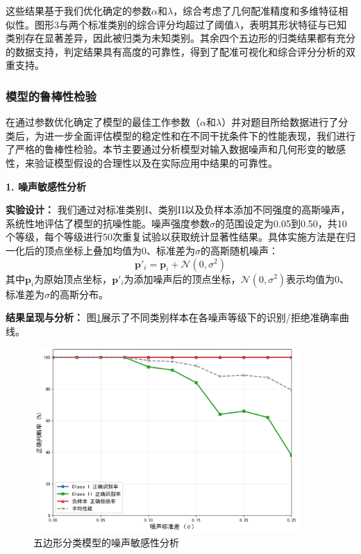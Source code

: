 这些结果基于我们优化确定的参数$\alpha$和$\lambda$，综合考虑了几何配准精度和多维特征相似性。图形3与两个标准类别的综合评分均超过了阈值$\lambda$，表明其形状特征与已知类别存在显著差异，因此被归类为未知类别。其余四个五边形的归类结果都有充分的数据支持，判定结果具有高度的可靠性，得到了配准可视化和综合评分分析的双重支持。

\subsubsection{模型的鲁棒性检验}
在通过参数优化确定了模型的最佳工作参数（$\alpha$和$\lambda$）并对题目所给数据进行了分类后，为进一步全面评估模型的稳定性和在不同干扰条件下的性能表现，我们进行了严格的鲁棒性检验。本节主要通过分析模型对输入数据噪声和几何形变的敏感性，来验证模型假设的合理性以及在实际应用中结果的可靠性。

\textbf{1. 噪声敏感性分析}

\textbf{实验设计：} 我们通过对标准类别I、类别II以及负样本添加不同强度的高斯噪声，系统性地评估了模型的抗噪性能。噪声强度参数$\sigma$的范围设定为0.05到0.50，共10个等级，每个等级进行50次重复试验以获取统计显著性结果。具体实施方法是在归一化后的顶点坐标上叠加均值为0、标准差为$\sigma$的高斯随机噪声：
\begin{equation}
    \mathbf{p}'_i = \mathbf{p}_i + \mathcal{N}(0, \sigma^2)
\end{equation}
其中$\mathbf{p}_i$为原始顶点坐标，$\mathbf{p}'_i$为添加噪声后的顶点坐标，$\mathcal{N}(0, \sigma^2)$表示均值为0、标准差为$\sigma$的高斯分布。

\textbf{结果呈现与分析：} 图\ref{fig:noise_analysis}展示了不同类别样本在各噪声等级下的识别/拒绝准确率曲线。

\begin{figure}[H]
    \centering
    \includegraphics[width=0.9\textwidth]{figures/robustness/pentagon_robustness_noise.png}
    \caption{五边形分类模型的噪声敏感性分析}
    \label{fig:noise_analysis}
\end{figure}

